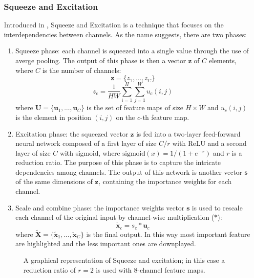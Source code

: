 \subsubsection{Squeeze and Excitation}\label{sec:SqueezeExcitation}
Introduced in \cite{hu2019squeezeandexcitationnetworks}, Squeeze and Excitation is a technique that focuses on
the interdependencies between channels. As the name suggests, there are two phases:
\begin{enumerate}
    \item Squeeze phase: each channel is squeezed into a single value through the use of averge pooling.
        The output of this phase is then a vector $\bm{z}$ of $C$ elements, where $C$ is the number of
        channels:
        $$ \bm{z} =\{z_1,\dots,z_C\} $$
        \begin{equation}
            z_c = \frac{1}{HW}\sum_{i=1}^{H}\sum_{j=1}^{W}u_c(i,j) \tag*{c=1,\dots,C}
        \end{equation}
        where $\bm{U}=\{\bm{u}_1,\dots,\bm{u}_C\}$ is the set of feature maps of size $H\times W$ and
         $u_c(i,j)$ is the element in position $(i,j)$ on the $c$-th feature map.
    \item Excitation phase: the squeezed vector $\bm{z}$ is fed into a two-layer feed-forward neural network
        composed of a first layer of size $C/r$ with ReLU and a second layer of size $C$ with sigmoid, where
        $\text{sigmoid}(x)= 1/(1+e^{-x})$ and $r$ is a reduction ratio.
        The purpose of this phase is to capture the intricate dependencies among channels. The output of this 
        network is another vector $\bm{s}$ of the same dimensions of $\bm{z}$, containing the importance 
        weights for each channel.
    \item Scale and combine phase: the importance weights vector $\bm{s}$ is used to rescale each channel of 
        the original input by channel-wise multiplication ($*$):
        \begin{equation}
        \tilde{\bm{x}}_c = s_c * \bm{u}_c   \tag*{c=1,\dots,C}
        \end{equation}
        where $\tilde{\bm{X}} = \{\tilde{\bm{x}}_1,\dots,\tilde{\bm{x}}_C\}$ is the final output. In this
        way most important feature are highlighted and the less important ones are downplayed.
\end{enumerate}

\begin{figure}[H]
    \centering
    \resizebox{\textwidth}{!}{}
    \captionsetup{width=0.94\linewidth}
    \caption{A graphical representation of Squeeze and excitation; in this case a reduction ratio of $r=2$ 
    is used with 8-channel feature maps.}
\end{figure}


